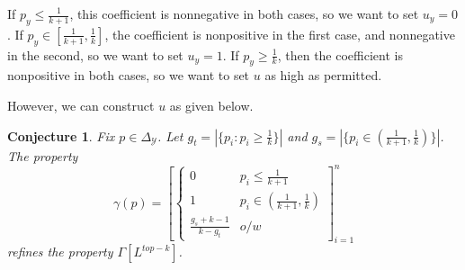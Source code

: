 \documentclass[12pt]{article}
\newcommand{\prop}[1]{\Gamma[#1]}
\newcommand{\ubar}{\bar{u}}
\newcommand{\simplex}{\Delta_\Y}
\newcommand{\Y}{\mathcal{Y}}
\newcommand{\inprod}[2]{\langle #1, #2 \rangle}%
\newcommand{\ones}{\mathbbm{1}}
\newtheorem{conjecture}{Conjecture}
\begin{document}
If $p_y \leq \frac 1 {k+1}$, this coefficient is nonnegative in both cases, so we want to set $u_y = 0$.
If $p_y \in [\frac 1 {k+1}, \frac 1 k]$, the coefficient is nonpositive in the first case, and nonnegative in the second, so we want to set $u_y = 1$.
If $p_y \geq \frac 1 k$, then the coefficient is nonpositive in both cases, so we want to set $u$ as high as permitted.
%
%


However, we can construct $u$ as given below.
\begin{conjecture}
	Fix $p \in \simplex$.
	Let $g_t = |\{p_i : p_i \geq \frac 1 k\}|$ and $g_s = | \{p_i \in (\frac{1}{k+1}, \frac{1}{k})\}|$.
	The property \[\gamma(p) = 
	\left[
	\begin{cases}
	0 & p_i \leq \frac {1}{k+1}\\
	1 & p_i \in (\frac{1}{k+1}, \frac{1}{k})\\
	\frac{g_s + k-1}{k-g_t} & o/w
	\end{cases}
	\right]_{i=1}^n
	\] refines the property $\prop{L^{top-k}}$.
\end{conjecture}
\end{document}
